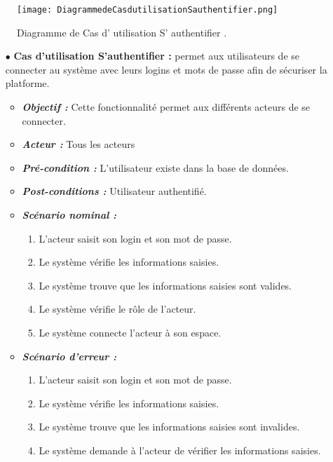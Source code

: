 \begin{figure}[ht]
	\centering
	\texttt{[image: DiagrammedeCasdutilisationSauthentifier.png]}
	\caption{Diagramme de Cas d' utilisation S' authentifier .}
\label{fig:Diagramme de Cas d utilisation S' authentifier }
\end{figure}
\FloatBarrier





\begin{itemize}
	
	\item[$\bullet$] \textbf{Cas d’utilisation S’authentifier :} permet aux utilisateurs de se connecter au système avec leurs logins et mots de passe afin de sécuriser la platforme.
	\medskip
	\begin{itemize}
		\item \textit{\textbf{Objectif :}}  Cette fonctionnalité permet aux différents acteurs de se connecter. 
		
		\item \textit{\textbf{Acteur :}} Tous les acteurs
		
		\item \textit{\textbf{Pré-condition  :}} L’utilisateur existe dans la base de données.
		\item \textit{\textbf{Post-conditions   :}} Utilisateur authentifié.
		\item \textit{\textbf{Scénario nominal :}}
		\begin{enumerate}
			\item L’acteur saisit son login et son mot de passe. 
			\item Le système vérifie les informations saisies. 
			\item Le système trouve que les informations saisies sont valides.  
			\item Le système vérifie le rôle de l’acteur.  
			\item Le système connecte l’acteur à son espace.
		\end{enumerate}
		\item \textit{\textbf{Scénario d'erreur :}} 
		\begin{enumerate}
			\item L’acteur saisit son login et son mot de passe. 
			\item Le système vérifie les informations saisies.   
			\item Le système trouve que les informations saisies sont invalides.  
			\item Le système demande à l’acteur de vérifier les informations saisies.
		\end{enumerate}
	\end{itemize}	
	\bigskip
\end{itemize}
\bigskip
